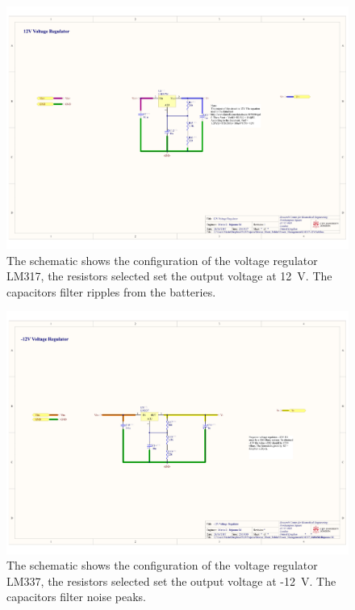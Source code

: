 \begin{landscape}
\begin{figure}[!htpb]
	\centering
	\includegraphics[width=\paperwidth,keepaspectratio]{power_supply_12}
	\caption[Schematic of the \SI{12}{\volt} voltage regulator]{The schematic shows the configuration of the voltage regulator LM317, the resistors selected set the output voltage at \SI{12}{\volt}. The capacitors filter ripples from the batteries.}
	\label{fig:schematic PS 12}
\end{figure}
\end{landscape}

\begin{landscape}
\begin{figure}[!htpb]
	\centering
	\includegraphics[width=\paperwidth,keepaspectratio]{power_supply_N12}
	\caption[Schematic of the -\SI{12}{\volt} voltage regulator]{The schematic shows the configuration of the voltage regulator LM337, the resistors selected set the output voltage at -\SI{12}{\volt}. The capacitors filter noise peaks.}
	\label{fig:schematic PS N12}
\end{figure}
\end{landscape}

